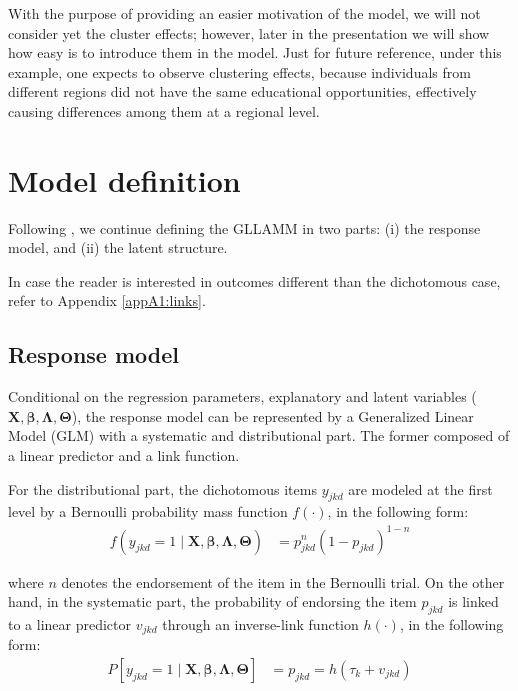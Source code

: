 With the purpose of providing an easier motivation of the model, we will not consider yet the cluster effects; however, later in the presentation we will show how easy is to introduce them in the model. Just for future reference, under this example, one expects to observe clustering effects, because individuals from different regions did not have the same educational opportunities, effectively causing differences among them at a regional level.


\section{Model definition} \label{sect:definition}

Following \citet{Rabe_et_al_2004a, Rabe_et_al_2004b}, we continue defining the GLLAMM in two parts: (i) the response model, and (ii) the latent structure.

In case the reader is interested in outcomes different than the dichotomous case, refer to Appendix \ref{appA1:links}.

\subsection{Response model} \label{s_sect:response}

Conditional on the regression parameters, explanatory and latent variables ($\mathbf{X},  \pmb{\beta}, \pmb{\Lambda}, \pmb{\Theta}$), the response model can be represented by a Generalized Linear Model (GLM) \cite{Nelder_et_al_1972, Nelder_et_al_1989} with a systematic and distributional part. The former composed of a linear predictor and a link function.

For the distributional part, the dichotomous items $y_{jkd}$ are modeled at the first level by a Bernoulli probability mass function $f(\cdot)$, in the following form:
\begin{equation} \label{eq:distributional}
	\begin{split}
		f \left( y_{jkd}=1 \; | \; \mathbf{X},  \pmb{\beta}, \pmb{\Lambda}, \pmb{\Theta} \right) &= p_{jkd}^{n} (1 - p_{jkd})^{1-n}
	\end{split}
\end{equation}

\noindent where $n$ denotes the endorsement of the item in the Bernoulli trial. On the other hand, in the systematic part, the probability of endorsing the item $p_{jkd}$ is linked to a linear predictor $v_{jkd}$ through an inverse-link function $h(\cdot)$, in the following form:
\begin{equation} \label{eq:systematic}
	\begin{split}
		P\left[ y_{jkd}=1 \; | \; \mathbf{X},  \pmb{\beta}, \pmb{\Lambda}, \pmb{\Theta} \right] &= p_{jkd} = h( \tau_{k} + v_{jkd} )
	\end{split}	
\end{equation}

